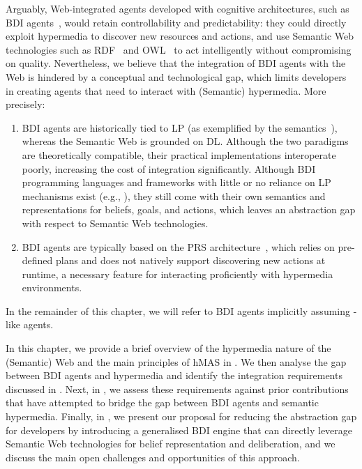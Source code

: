 Arguably,
Web-integrated agents developed with cognitive architectures,
such as \ac{BDI} agents~\cite{DBLP:conf/kr/RaoG91},
would retain controllability and predictability:
they could directly exploit hypermedia to discover new resources and actions,
and use Semantic Web technologies such as \ac{RDF}~\cite{RDF_Concepts_W3C:14} and \ac{OWL}~\cite{OWL_Syntax_W3C:12}
to act intelligently without compromising on quality.
%
Nevertheless,
we believe that
the integration of \ac{BDI} agents with the Web
is hindered by a conceptual and technological gap,
which limits developers in creating agents that need to interact with (Semantic) hypermedia.
%
More precisely:
\begin{enumerate}[label=\textbf{(G\arabic*)}]
    \item\label{gap:logic}
    \ac{BDI} agents are historically tied to \ac{LP}
    (as exemplified by the \agentspeak{} semantics~\cite{DBLP:conf/maamaw/Rao96}),
    whereas the Semantic Web is grounded on \ac{DL}.
    Although the two paradigms are theoretically compatible,
    their practical implementations interoperate poorly,
    increasing the cost of integration significantly.
    Although \ac{BDI} programming languages and frameworks with little or no reliance on \ac{LP} mechanisms exist
    (e.g., \cite{map2005sp,kampik2019emas,howden2001jack}),
    they still come with their own semantics and representations for beliefs, goals, and actions,
    which leaves an abstraction gap with respect to Semantic Web technologies.

    \item\label{gap:open-world}
    \ac{BDI} agents are typically based on the \ac{PRS} architecture~\cite{georgeff1986pieee},
    which relies on pre-defined plans and does not natively support discovering new actions at runtime,
    a necessary feature for interacting proficiently with hypermedia environments.
\end{enumerate}

In the remainder of this chapter,
we will refer to \ac{BDI} agents implicitly assuming \agentspeak{}-like agents.

In this chapter,
we provide a brief overview of the hypermedia nature of the (Semantic) Web
and the main principles of \ac{hMAS} in .
%
We then analyse the gap between \ac{BDI} agents and hypermedia
and identify the integration requirements discussed in .
%
Next,
in ,
we assess these requirements against prior contributions
that have attempted to bridge the gap between \ac{BDI} agents and semantic hypermedia.
%
Finally,
in ,
we present our proposal
for reducing the abstraction gap for developers
by introducing a generalised \ac{BDI} engine
that can directly leverage Semantic Web technologies for belief representation and deliberation,
and we discuss the main open challenges and opportunities of this approach.

